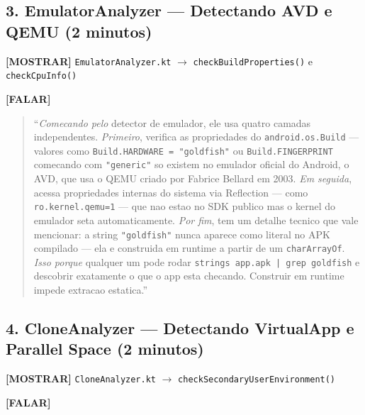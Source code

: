 \documentclass[12pt,a4paper]{article}
\begin{document}
\subsection*{3. EmulatorAnalyzer --- Detectando AVD e QEMU (2 minutos)}

\textbf{[MOSTRAR]} \texttt{EmulatorAnalyzer.kt} $\to$ \texttt{checkBuildProperties()} e \texttt{checkCpuInfo()}

\textbf{[FALAR]}

\begin{quote}
``\textit{Comecando pelo} detector de emulador, ele usa quatro camadas independentes.
\textit{Primeiro}, verifica as propriedades do \texttt{android.os.Build} ---
valores como \texttt{Build.HARDWARE = "goldfish"} ou \texttt{Build.FINGERPRINT}
comecando com \texttt{"generic"} so existem no emulador oficial do Android,
o AVD, que usa o QEMU criado por Fabrice Bellard em 2003.
\textit{Em seguida}, acessa propriedades internas do sistema via Reflection ---
como \texttt{ro.kernel.qemu=1} --- que nao estao no SDK publico mas
o kernel do emulador seta automaticamente.
\textit{Por fim}, tem um detalhe tecnico que vale mencionar:
a string \texttt{"goldfish"} nunca aparece como literal no APK compilado ---
ela e construida em runtime a partir de um \texttt{charArrayOf}.
\textit{Isso porque} qualquer um pode rodar \texttt{strings app.apk | grep goldfish}
e descobrir exatamente o que o app esta checando.
Construir em runtime impede extracao estatica.''
\end{quote}

\vspace{0.3cm}

\subsection*{4. CloneAnalyzer --- Detectando VirtualApp e Parallel Space (2 minutos)}

\textbf{[MOSTRAR]} \texttt{CloneAnalyzer.kt} $\to$ \texttt{checkSecondaryUserEnvironment()}

\textbf{[FALAR]}
\end{document}
